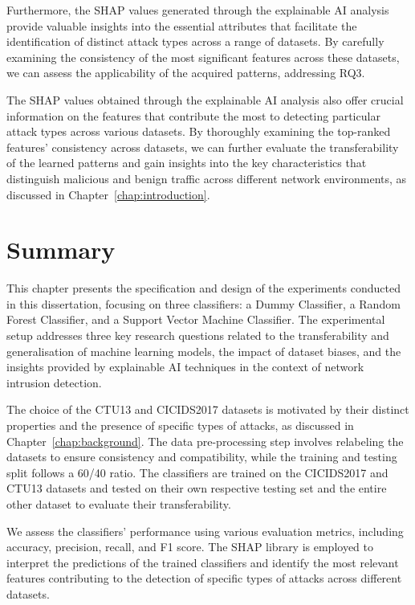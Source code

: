 Furthermore, the SHAP values generated through the explainable AI analysis provide valuable insights into the essential attributes that facilitate the identification of distinct attack types across a range of datasets. By carefully examining the consistency of the most significant features across these datasets, we can assess the applicability of the acquired patterns, addressing RQ3.

The SHAP values obtained through the explainable AI analysis also offer crucial information on the features that contribute the most to detecting particular attack types across various datasets. By thoroughly examining the top-ranked features' consistency across datasets, we can further evaluate the transferability of the learned patterns and gain insights into the key characteristics that distinguish malicious and benign traffic across different network environments, as discussed in Chapter~\ref{chap:introduction}.

\section{Summary}\label{sec:Summary}

This chapter presents the specification and design of the experiments conducted in this dissertation, focusing on three classifiers: a Dummy Classifier, a Random Forest Classifier, and a Support Vector Machine Classifier. The experimental setup addresses three key research questions related to the transferability and generalisation of machine learning models, the impact of dataset biases, and the insights provided by explainable AI techniques in the context of network intrusion detection.

The choice of the CTU13 and CICIDS2017 datasets is motivated by their distinct properties and the presence of specific types of attacks, as discussed in Chapter~\ref{chap:background}. The data pre-processing step involves relabeling the datasets to ensure consistency and compatibility, while the training and testing split follows a 60/40 ratio. The classifiers are trained on the CICIDS2017 and CTU13 datasets and tested on their own respective testing set and the entire other dataset to evaluate their transferability.

We assess the classifiers' performance using various evaluation metrics, including accuracy, precision, recall, and F1 score. The SHAP library is employed to interpret the predictions of the trained classifiers and identify the most relevant features contributing to the detection of specific types of attacks across different datasets.

